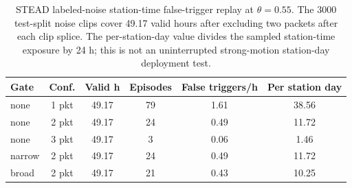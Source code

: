 \begin{table}[!t]
\centering
\caption{STEAD labeled-noise station-time false-trigger replay at $\theta=0.55$. The 3000 test-split noise clips cover 49.17 valid hours after excluding two packets after each clip splice. The per-station-day value divides the sampled station-time exposure by 24 h; this is not an uninterrupted strong-motion station-day deployment test.}
\label{tab:stead_noise_false_alarm}
{\tgrsdensetablesetup
\begin{tabular}{@{}lccccc@{}}
\toprule
Gate & Conf. & Valid h & Episodes & False triggers/h & Per station day\\
\midrule
none & 1 pkt & 49.17 & 79 & 1.61 & 38.56\\
none & 2 pkt & 49.17 & 24 & 0.49 & 11.72\\
none & 3 pkt & 49.17 & 3 & 0.06 & 1.46\\
narrow & 2 pkt & 49.17 & 24 & 0.49 & 11.72\\
broad & 2 pkt & 49.17 & 21 & 0.43 & 10.25\\
\bottomrule
\end{tabular}}
\end{table}
